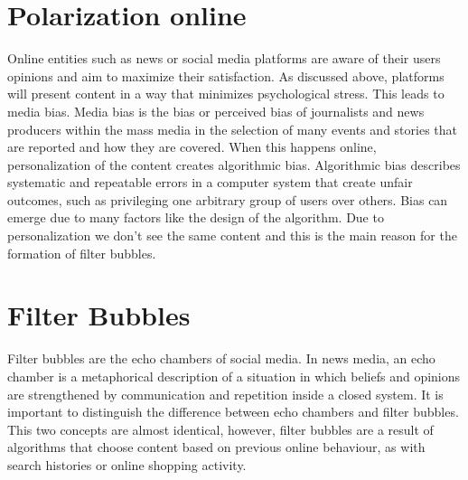 \label{sec:Structure}

\section{Polarization online}

Online entities such as news or social media platforms are aware of their users opinions  and aim to maximize their satisfaction. As discussed above, platforms will present content in a way that minimizes psychological stress. This leads to media bias. Media bias is the bias or perceived bias of journalists and news producers within the mass media in the selection of many events and stories that are reported and how they are covered. When this happens online, personalization of the content creates algorithmic bias. Algorithmic bias describes systematic and repeatable errors in a computer system that create unfair outcomes, such as privileging one arbitrary group of users over others. Bias can emerge due to many factors like the design of the algorithm. Due to personalization we don't see the same content and this is the main reason for the formation of filter bubbles.

\section{Filter Bubbles}

Filter bubbles are the echo chambers of social media. In news media, an echo chamber is a metaphorical description of a situation in which beliefs  and opinions are strengthened by communication and repetition inside a closed system. It is important to distinguish the difference between echo chambers and filter bubbles. This two concepts are almost identical, however,  filter bubbles are a result of algorithms that choose content based on previous online behaviour, as with search histories or online shopping activity.


